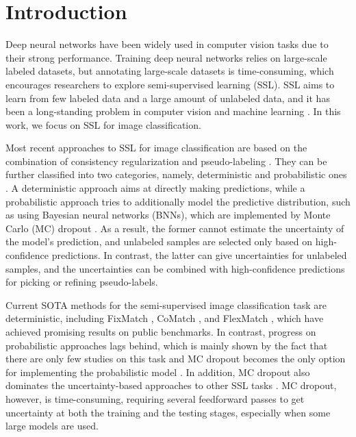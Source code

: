 \documentclass[nohyperref]{article}
\theoremstyle{plain}
\theoremstyle{definition}
\theoremstyle{remark}
\begin{document}
\section{Introduction}
\label{intro}
Deep neural networks have been widely used in computer vision tasks \cite{krizhevsky2012imagenet, simonyan2014very, szegedy2015going, szegedy2016rethinking, he2016deep} due to their strong performance. Training deep neural networks relies on large-scale labeled datasets, but annotating large-scale datasets is time-consuming, which encourages researchers to explore semi-supervised learning (SSL). SSL aims to learn from few labeled data and a large amount of unlabeled data, and it has been a long-standing problem in computer vision and machine learning \cite{sohn2020fixmatch, zhang2021flexmatch, rizve2021defense, pham2021meta, li2014towards, liu2010large, berthelot2019mixmatch, berthelot2019remixmatch}. In this work, we focus on SSL for image classification. 

Most recent approaches to SSL for image classification are based on the combination of consistency regularization and pseudo-labeling \cite{sohn2020fixmatch, li2021comatch, rizve2021defense, zhang2021flexmatch, nassar2021all, pham2021meta, hu2021simple}. They  can be further classified into two categories, namely,  deterministic \cite{sohn2020fixmatch, li2021comatch, zhang2021flexmatch, nassar2021all, pham2021meta, hu2021simple} and probabilistic ones \cite{rizve2021defense}. 
A deterministic approach aims at directly making predictions, while a probabilistic approach tries to additionally model the predictive distribution, such as using Bayesian neural networks (BNNs), which are implemented by Monte Carlo (MC) dropout \cite{gal2016dropout}. 
As a result, the former cannot estimate the uncertainty of the model's prediction, and unlabeled samples are selected only based on  high-confidence predictions. In contrast, the latter can give uncertainties for unlabeled samples, and the uncertainties can be combined with high-confidence predictions for picking or refining pseudo-labels. 


Current SOTA methods for the semi-supervised image classification task are deterministic, including FixMatch \cite{sohn2020fixmatch}, CoMatch \cite{li2021comatch}, and FlexMatch \cite{zhang2021flexmatch}, which have achieved promising results on public benchmarks. 
In contrast, progress on probabilistic approaches 
lags behind, which is mainly shown by the fact that there are only few studies on this task and MC dropout becomes the only option for implementing the probabilistic model \cite{rizve2021defense}. In addition, 
MC dropout also dominates the uncertainty-based approaches to other SSL tasks \cite{sedai2019uncertainty, shi2021inconsistency, wang2021tripled, yu2019uncertainty, zhu2020grasping}. MC dropout, however, is time-consuming, requiring several feedforward passes to get uncertainty at both the training and the testing stages, especially when some large models are used. 
\end{document}
